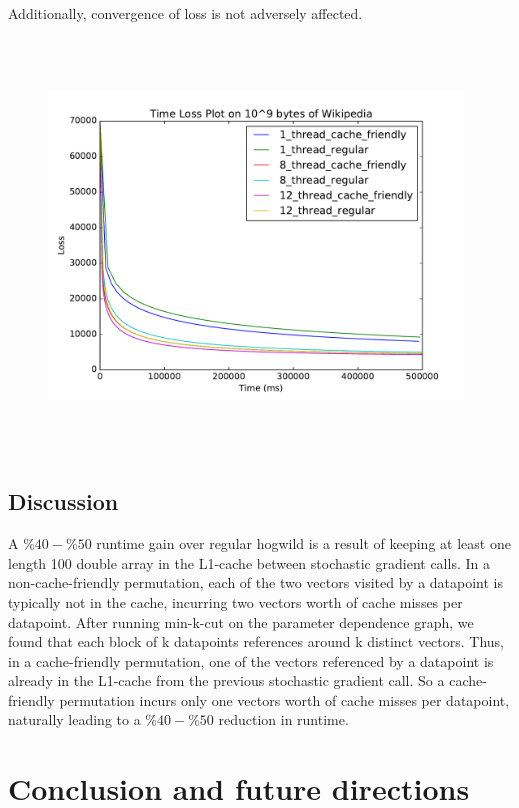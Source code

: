 \documentclass[times,11pt]{article}
\numberwithin{equation}{section}		%
\numberwithin{figure}{section}			%
\numberwithin{table}{section}				%
\begin{document}
\noindent Additionally, convergence of loss is not adversely affected.
\begin{figure}[H]
\begin{center}
\includegraphics[width=11cm,height=11cm,keepaspectratio]{w2v_time_loss_plot.pdf}
\end{center}
\end{figure}

\subsection{Discussion}

A $\%40-\%50$ runtime gain over regular hogwild is a result of keeping
at least one length 100 double array in the L1-cache between
stochastic gradient calls. In a non-cache-friendly permutation, each
of the two vectors visited by a datapoint is typically not in the
cache, incurring two vectors worth of cache misses per
datapoint. After running min-k-cut on the parameter dependence graph,
we found that each block of k datapoints references around k distinct
vectors. Thus, in a cache-friendly permutation, one of the vectors
referenced by a datapoint is already in the L1-cache from the previous
stochastic gradient call. So a cache-friendly permutation incurs only
one vectors worth of cache misses per datapoint, naturally leading to
a $\%40-\%50$ reduction in runtime.

\section{Conclusion and future directions}\label{sec:conc}
\end{document}

